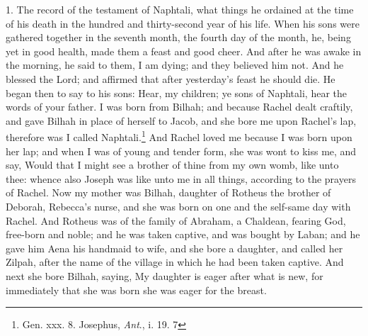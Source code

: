 1. The record of the testament of Naphtali, what things he ordained at the time of his death in the hundred and thirty-second year of his life. When his sons were gathered together in the seventh month, the fourth day of the month, he, being yet in good health, made them a feast and good cheer. And after he was awake in the morning, he said to them, I am dying; and they believed him not. And he blessed the Lord; and affirmed that after yesterday’s feast he should die. He began then to say to his sons: Hear, my children; ye sons of Naphtali, hear the words of your father. I was born from Bilhah; and because Rachel dealt craftily, and gave Bilhah in place of herself to Jacob, and she bore me upon Rachel’s lap, therefore was I called Naphtali.\footnote{Gen. xxx. 8. Josephus, \emph{Ant}., i. 19. 7} And Rachel loved me because I was born upon her lap; and when I was of young and tender form, she was wont to kiss me, and say, Would that I might see a brother of thine from my own womb, like unto thee: whence also Joseph was like unto me in all things, according to the prayers of Rachel. Now my mother was Bilhah, daughter of Rotheus the brother of Deborah, Rebecca’s nurse, and she was born on one and the self-same day with Rachel. And Rotheus was of the family of Abraham, a Chaldean, fearing God, free-born and noble; and he was taken captive, and was bought by Laban; and he gave him Aena his handmaid to wife, and she bore a daughter, and called her Zilpah, after the name of the village in which he had been taken captive. And next she bore Bilhah, saying, My daughter is eager after what is new, for immediately that she was born she was eager for the breast.

